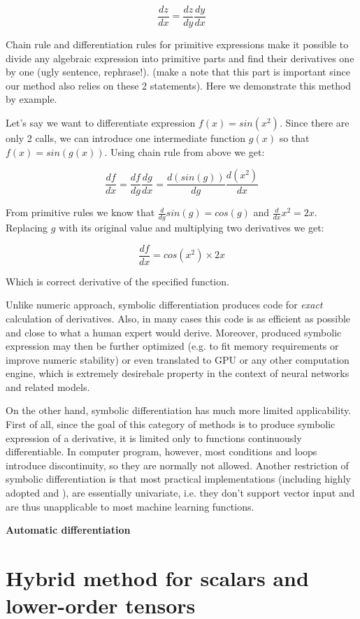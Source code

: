 \documentclass[conference]{IEEEtran}
\begin{document}
$$\frac{dz}{dx} = \frac{dz}{dy}\frac{dy}{dx}$$

Chain rule and differentiation rules for primitive expressions make it possible to divide any algebraic expression into primitive parts and find their derivatives one by one (ugly sentence, rephrase!). (make a note that this part is important since our method also relies on these 2 statements). Here we demonstrate this method by example. 

Let's say we want to differentiate expression $f(x) = sin(x^2)$. Since there are only 2 calls, we can introduce one intermediate function $g(x)$ so that $f(x) = sin(g(x))$. Using chain rule from above we get: 

$$\frac{df}{dx} = \frac{df}{dg}\frac{dg}{dx} = \frac{d(sin(g))}{dg}\frac{d(x^2)}{dx}$$

From primitive rules we know that $\frac{d}{dg}sin(g) = cos(g)$ and $\frac{d}{dx}x^2 = 2x$. Replacing $g$ with its original value and multiplying two derivatives we get: 

$$\frac{df}{dx} = cos(x^2) \times 2x$$

Which is correct derivative of the specified function. 

Unlike numeric approach, symbolic differentiation produces code for \textit{exact} calculation of derivatives. Also, in many cases this code is as efficient as possible and close to what a human expert would derive. Moreover, produced symbolic expression may then be further optimized (e.g. to fit memory requirements or improve numeric stability) or even translated to GPU or any other computation engine, which is extremely desirebale property in the context of neural networks and related models.

On the other hand, symbolic differentiation has much more limited applicability. First of all, since the goal of this category of methods is to produce symbolic expression of a derivative, it is limited only to functions continuously differentiable. In computer program, however, most conditions and loops introduce discontinuity, so they are normally not allowed. Another restriction of symbolic differentiation is that most practical implementations (including highly adopted \cite{SymPy} and \cite{Mathematica}), are essentially univariate, i.e. they don't support vector input and are thus unapplicable to most machine learning functions.

\textbf{Automatic differentiation}



\section{Hybrid method for scalars and lower-order tensors}
\end{document}
